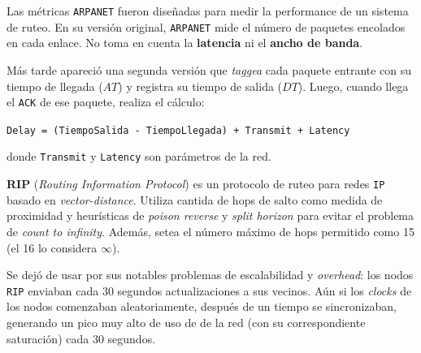 \documentclass[]{article}
\begin{document}







Las métricas \texttt{ARPANET} fueron diseñadas para medir la performance de un sistema de ruteo. En su versión original, \texttt{ARPANET} mide el número de paquetes encolados en cada enlace. No toma en cuenta la \textbf{latencia} ni el \textbf{ancho de banda}.

Más tarde apareció una segunda versión que \emph{taggea} cada paquete entrante con su tiempo de llegada ($AT$) y registra su tiempo de salida ($DT$). Luego, cuando llega el \texttt{ACK} de ese paquete, realiza el cálculo:
\begin{center}
    \texttt{Delay = (TiempoSalida - TiempoLlegada) + Transmit + Latency}
\end{center}

donde \texttt{Transmit} y \texttt{Latency} son parámetros de la red.





\textbf{RIP} (\emph{Routing Information Protocol}) es un protocolo de ruteo para redes \texttt{IP} basado en \emph{vector-distance}. Utiliza cantida de hops de salto como medida de proximidad y heurísticas de \emph{poison reverse} y \emph{split horizon} para evitar el problema de \emph{count to infinity}. Además, setea el número máximo de hops permitido como 15 (el 16 lo considera $\infty$).

Se dejó de usar por sus notables problemas de escalabilidad y \emph{overhead}: los nodos \texttt{RIP} enviaban cada 30 segundos actualizaciones a sus vecinos. Aún si los \emph{clocks} de los nodos comenzaban aleatoriamente, después de un tiempo se sincronizaban, generando un pico muy alto de uso de de la red (con su correspondiente saturación) cada 30 segundos.
\end{document}
